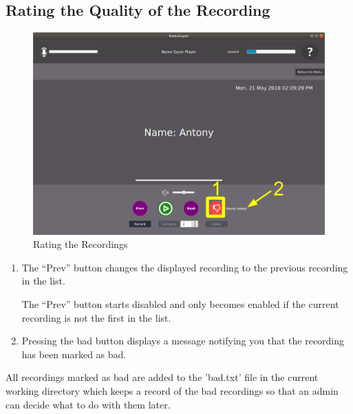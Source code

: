 \documentclass[a4paper,12pt]{article}
\begin{document}
\subsection{Rating the Quality of the Recording}
\begin{figure}[!h]
	\includegraphics[width=\linewidth]{rating.png}
	\caption{Rating the Recordings}
\end{figure}
\begin{enumerate}[label=\textbf{\arabic*}]
	\item The “Prev” button changes the displayed recording to the previous recording in the list.
	
	The “Prev” button starts disabled and only becomes enabled if the current recording is not the first in the list.
	
	\item Pressing the bad button displays a message notifying you that the recording has been marked as bad.
\end{enumerate}
All recordings marked as bad are added to the 'bad.txt' file in the current working directory which keeps a record of the bad recordings so that an admin can decide what to do with them later.
\newpage
\end{document}
